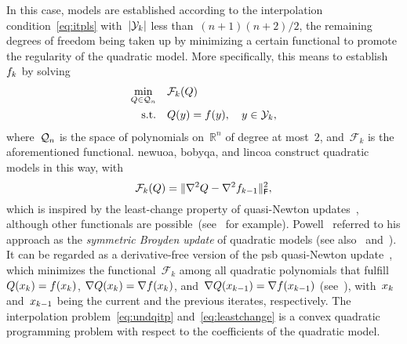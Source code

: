 \documentclass[
    smallextended,  %
    draft,          %
]{svjour3}
\newcommand{\R}{\mathbb{R}}
\newcommand{\abs}[2][]{#1\lvert#2#1\rvert}
\newcommand{\frob}{\mathsf{F}}
\newcommand{\func}{\mathcal{F}}
\newcommand{\iter}[1][k]{x\ifthenelse{\equal{#1}{}}{}{_{#1}}}
\newcommand{\norm}[2][]{#1\lVert#2#1\rVert}
\newcommand{\objm}[1][k]{\obj\ifthenelse{\equal{#1}{}}{}{_{#1}}}
\newcommand{\obj}{f}
\newcommand{\qspace}[1][n]{\mathcal{Q}\ifthenelse{\equal{#1}{}}{}{_{#1}}}
\newcommand{\st}{\text{s.t.}}
\newcommand{\xpt}[1][k]{\mathcal{Y}\ifthenelse{\equal{#1}{}}{}{_{#1}}}
\begin{document}
In this case, models are established according to the interpolation condition~\eqref{eq:itpls} with~$\abs{\xpt}$ less than~$(n + 1)(n + 2) / 2$, the remaining degrees of freedom being taken up by minimizing a certain functional to promote the regularity of the quadratic model.
More specifically, this means to establish~$\objm$ by solving
\begin{equation}
    \label{eq:undqitp}
    \begin{split}
        \min_{Q \in \qspace}    & \quad \func_k(Q) \\
        \st                     & \quad Q(y) = \obj(y), \quad y \in \xpt,
    \end{split}
\end{equation}
where~$\qspace$ is the space of polynomials on~$\R^n$ of degree at most~$2$, and~$\func_k$ is the aforementioned functional.
\Gls{newuoa}, \gls{bobyqa}, and \gls{lincoa} construct quadratic models in this way, with
\begin{equation}
    \label{eq:leastchange}
    \func_k(Q) = \norm{\nabla^2 Q - \nabla^2 \objm[k - 1]}_{\frob}^2,
\end{equation}
which is inspired by the least-change property of quasi-Newton updates~\cite{Dennis_Schnabel_1979}, although other functionals are possible~(see~\cite{Conn_Toint_1996,Bandeira_Scheinberg_Vicente_2012,Powell_2013,Zhang_2014} for example).
Powell~\cite{Powell_2013} referred to his approach as the \emph{symmetric Broyden update} of
quadratic models (see also~\cite[\S~3.6]{Zhang_2012} and~\cite[\S~2.4.2]{Ragonneau_2022}).
It can be regarded as a derivative-free version of the \gls{psb} quasi-Newton update~\cite{Powell_1970b}, which minimizes the functional~$\func_k$ among all quadratic polynomials that fulfill~$Q(\iter) = \obj(\iter)$, $\nabla Q(\iter) = \nabla \obj(\iter)$, and~$\nabla Q(\iter[k - 1]) = \nabla \obj(\iter[k - 1])$ (see~\cite[Theorem~4.2]{Dennis_Schnabel_1979}), with~$\iter$ and~$\iter[k - 1]$ being the current and the previous iterates, respectively.
The interpolation problem~\eqref{eq:undqitp} and~\eqref{eq:leastchange} is a convex quadratic programming problem with respect to the coefficients of the quadratic model.
\end{document}
